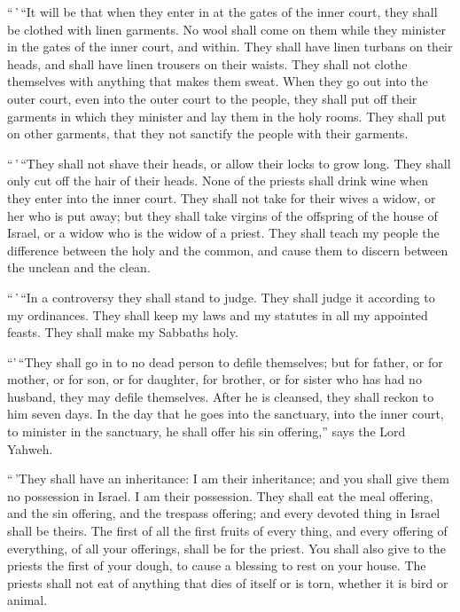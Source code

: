  ``\,'\,``It will be that when they enter in at the gates
of the inner court, they shall be clothed with linen garments. No wool
shall come on them while they minister in the gates of the inner court,
and within.  They shall have linen turbans on their
heads, and shall have linen trousers on their waists. They shall not
clothe themselves with anything that makes them sweat. 
When they go out into the outer court, even into the outer court to the
people, they shall put off their garments in which they minister and lay
them in the holy rooms. They shall put on other garments, that they not
sanctify the people with their garments.

 ``\,'\,``They shall not shave their heads, or allow
their locks to grow long. They shall only cut off the hair of their
heads.  None of the priests shall drink wine when they
enter into the inner court.  They shall not take for
their wives a widow, or her who is put away; but they shall take virgins
of the offspring of the house of Israel, or a widow who is the widow of
a priest.  They shall teach my people the difference
between the holy and the common, and cause them to discern between the
unclean and the clean.

 ``\,'\,``In a controversy they shall stand to judge.
They shall judge it according to my ordinances. They shall keep my laws
and my statutes in all my appointed feasts. They shall make my Sabbaths
holy.

 ``'\,``They shall go in to no dead person to defile
themselves; but for father, or for mother, or for son, or for daughter,
for brother, or for sister who has had no husband, they may defile
themselves.  After he is cleansed, they shall reckon to
him seven days.  In the day that he goes into the
sanctuary, into the inner court, to minister in the sanctuary, he shall
offer his sin offering,'' says the Lord Yahweh.

 ``\,'They shall have an inheritance: I am their
inheritance; and you shall give them no possession in Israel. I am their
possession.  They shall eat the meal offering, and the
sin offering, and the trespass offering; and every devoted thing in
Israel shall be theirs.  The first of all the first
fruits of every thing, and every offering of everything, of all your
offerings, shall be for the priest. You shall also give to the priests
the first of your dough, to cause a blessing to rest on your house.
 The priests shall not eat of anything that dies of
itself or is torn, whether it is bird or animal.

